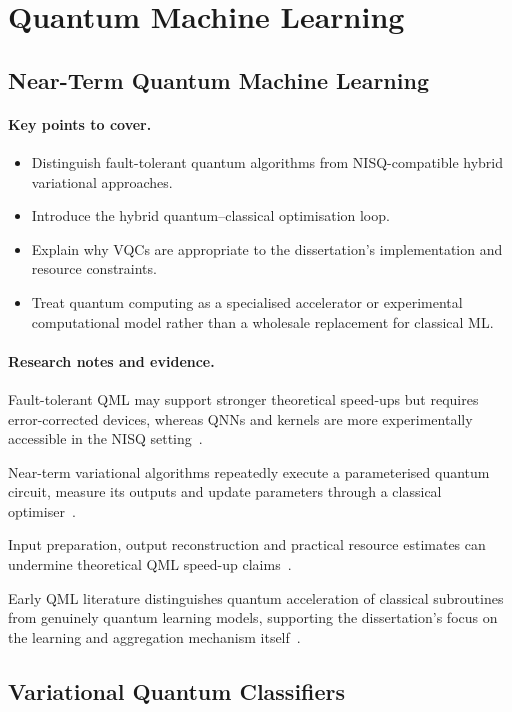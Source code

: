 \documentclass[]{UCD_CS_MSc_AAI_Report}
\newcommand{\limitation}[1]{{\color{orange}#1}}
\newcommand{\method}[1]{{\color{cyan!80!black}#1}}
\newcommand{\comparison}[1]{{\color{pink!70!violet}#1}}
\newcommand{\sectionbrief}{\paragraph{Key points to cover.}}
\newcommand{\researchnotes}{\paragraph{Research notes and evidence.}}
\begin{document}
\section{Quantum Machine Learning}
\label{sec:rw-qml}

\subsection{Near-Term Quantum Machine Learning}

\sectionbrief
\begin{itemize}
    \item Distinguish fault-tolerant quantum algorithms from NISQ-compatible hybrid variational approaches.
    \item Introduce the hybrid quantum--classical optimisation loop.
    \item Explain why VQCs are appropriate to the dissertation's implementation and resource constraints.
    \item Treat quantum computing as a specialised accelerator or experimental computational model rather than a wholesale replacement for classical ML.
\end{itemize}

\researchnotes
\begin{itemize}
    \comparison{\item Fault-tolerant QML may support stronger theoretical speed-ups but requires error-corrected devices, whereas QNNs and kernels are more experimentally accessible in the NISQ setting~\cite{du_quantum_2025}.}
    \method{\item Near-term variational algorithms repeatedly execute a parameterised quantum circuit, measure its outputs and update parameters through a classical optimiser~\cite{resch_quantum_2019,du_quantum_2025}.}
    \limitation{\item Input preparation, output reconstruction and practical resource estimates can undermine theoretical QML speed-up claims~\cite{biamonte_quantum_2017}.}
    \comparison{\item Early QML literature distinguishes quantum acceleration of classical subroutines from genuinely quantum learning models, supporting the dissertation's focus on the learning and aggregation mechanism itself~\cite{schuld_introduction_2015}.}
\end{itemize}

\subsection{Variational Quantum Classifiers}
\end{document}
